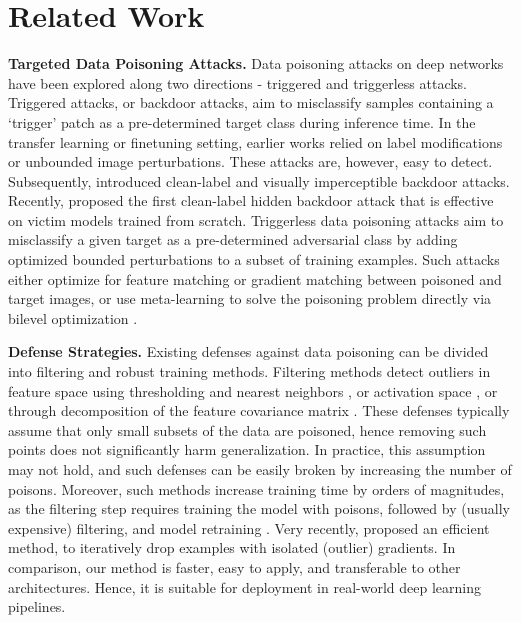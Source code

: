 \documentclass{article}
\begin{document}
\section{Related Work}
\textbf{Targeted Data Poisoning Attacks.}
Data poisoning attacks on deep networks have been explored along two directions - triggered and triggerless attacks. Triggered attacks, or backdoor attacks, aim to misclassify samples containing a `trigger' patch as a pre-determined target class during inference time. In the transfer learning or finetuning setting, earlier works \cite{chen2017targeted,gu2017badnets,liu2017trojaning} relied on label modifications or unbounded image perturbations. 
These attacks are, however, easy to detect.
Subsequently, \cite{Saha2019htbd,souri2021sleeper,turner2018clean} introduced clean-label and visually imperceptible backdoor attacks. Recently, \cite{souri2021sleeper} proposed the first clean-label hidden backdoor attack that is effective on victim models trained from scratch. Triggerless data poisoning attacks aim to misclassify a given target as a pre-determined adversarial class by adding optimized bounded perturbations to a subset of training examples. Such attacks either optimize for feature matching \citep{aghakhani2021bullseye,Shafahi2018poisonfrogs,zhu2019transferable} or %
gradient matching \citep{geiping2020witches} between poisoned and target images, or use meta-learning to solve the poisoning problem directly via bilevel optimization \citep{huang2020metapoison} . 












\textbf{Defense Strategies.}
Existing defenses against data poisoning can be divided into filtering and robust training methods. Filtering methods detect outliers in feature space using thresholding \citep{Steinhardt17certified} and nearest neighbors \citep{peri2020deep}, or activation space \citep{chen2019detecting}, or through decomposition of the feature covariance matrix \citep{tran2018spectral}.
These defenses typically assume that only small subsets of the data are poisoned, hence removing such points does not significantly harm generalization. In practice, this assumption may not hold, and such defenses can be easily broken by increasing the number of poisons. Moreover, such methods increase training time by orders of magnitudes, as the filtering step requires %
training the model with poisons, followed by (usually expensive) filtering, and model retraining
\citep{chen2019detecting,peri2020deep,Steinhardt17certified,tran2018spectral}. Very recently, \cite{yang2022not} proposed an efficient method, to iteratively drop examples with isolated (outlier) gradients. %
In comparison, our method is faster, easy to apply, and transferable to other architectures. Hence, it is suitable for deployment in real-world deep learning pipelines.
\end{document}
